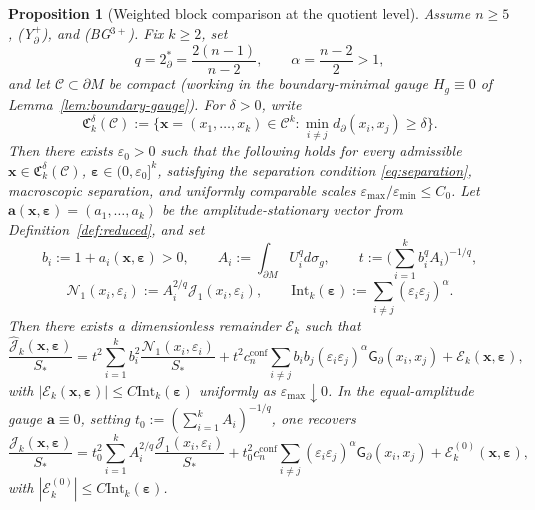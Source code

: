 \documentclass[11pt,reqno,a4paper]{amsart}
\numberwithin{equation}{section}
\theoremstyle{plain}
\newtheorem{proposition}[theorem]{Proposition}
\theoremstyle{remark}
\theoremstyle{plain}
\begin{document}
\begin{proposition}[Weighted block comparison at the quotient level]
\label{prop:block-resolvent-comparison}
Assume $n\ge5$, \textup{(Y$^+_{\partial}$)}, and \textup{(BG$^{3+}$)}.
Fix $k\ge2$, set
\[
q=2^*_{\partial}=\frac{2(n-1)}{n-2},
\qquad
\alpha=\frac{n-2}{2}>1,
\]
and let $\mathcal C\subset \partial M$ be compact (working in the boundary-minimal gauge $H_g\equiv0$ of Lemma~\ref{lem:boundary-gauge}).
For $\delta>0$, write
\[
\mathfrak C_k^\delta(\mathcal C)
:=\Big\{\mathbf x=(x_1,\dots,x_k)\in \mathcal C^k:
\min_{i\neq j} d_\partial(x_i,x_j)\ge \delta\Big\}.
\]
Then there exists $\varepsilon_0>0$ such that the following holds for every admissible
$\mathbf x\in\mathfrak C_k^\delta(\mathcal C)$,
$\boldsymbol\varepsilon\in(0,\varepsilon_0]^k$,
satisfying the separation condition \eqref{eq:separation}, macroscopic separation,
and uniformly comparable scales
$\varepsilon_{\max}/\varepsilon_{\min}\le C_0$.
Let
$\mathbf a(\mathbf x,\boldsymbol\varepsilon)=(a_1,\dots,a_k)$
be the amplitude-stationary vector from Definition~\ref{def:reduced}, and set
\[
b_i:=1+a_i(\mathbf x,\boldsymbol\varepsilon)>0,
\qquad
A_i:=\int_{\partial M}U_i^qd\sigma_g,
\qquad
t:=\Big(\sum_{i=1}^k b_i^q A_i\Big)^{-1/q},
\]
\[
\mathcal N_1(x_i,\varepsilon_i):=A_i^{2/q}\mathcal J_1(x_i,\varepsilon_i),
\qquad
\mathrm{Int}_k(\boldsymbol\varepsilon):=\sum_{i\neq j}(\varepsilon_i\varepsilon_j)^\alpha.
\]
Then there exists a dimensionless remainder $\mathcal E_k$ such that
\begin{equation}\label{eq:Jk-interaction-comparison}
\frac{\hat{\mathcal J}_k(\mathbf x,\boldsymbol\varepsilon)}{S_\ast}
=
t^2\sum_{i=1}^k b_i^2\frac{\mathcal N_1(x_i,\varepsilon_i)}{S_\ast}
+t^2 c_n^{\mathrm{conf}}\sum_{i\neq j}
 b_i b_j (\varepsilon_i\varepsilon_j)^\alpha\mathsf G_\partial(x_i,x_j)
+\mathcal E_k(\mathbf x,\boldsymbol\varepsilon),
\end{equation}
with
$|\mathcal E_k(\mathbf x,\boldsymbol\varepsilon)|
\le C\mathrm{Int}_k(\boldsymbol\varepsilon)$
uniformly as $\varepsilon_{\max}\downarrow0$.
In the equal-amplitude gauge $\mathbf a\equiv0$, setting
$t_0:=(\sum_{i=1}^k A_i)^{-1/q}$, one recovers
\[
\frac{\mathcal J_k(\mathbf x,\boldsymbol\varepsilon)}{S_\ast}
=
t_0^2\sum_{i=1}^k A_i^{2/q}\frac{\mathcal J_1(x_i,\varepsilon_i)}{S_\ast}
+t_0^2 c_n^{\mathrm{conf}}\sum_{i\neq j}(\varepsilon_i\varepsilon_j)^\alpha\mathsf G_\partial(x_i,x_j)
+\mathcal E_k^{(0)}(\mathbf x,\boldsymbol\varepsilon),
\]
with $|\mathcal E_k^{(0)}|\le C\mathrm{Int}_k(\boldsymbol\varepsilon)$.
\end{proposition}
\end{document}
